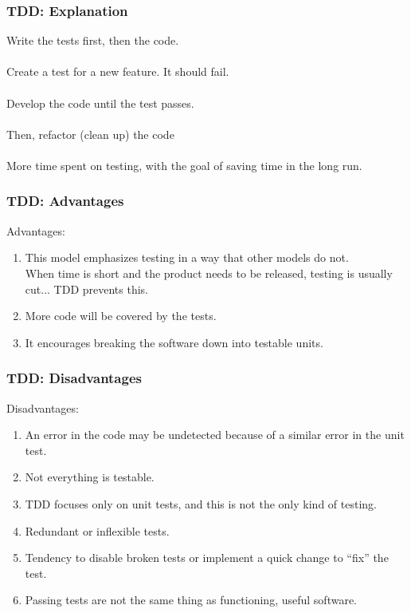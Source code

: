 \begin{frame}
\frametitle{TDD: Explanation}
\begin{changemargin}{1.5cm}

Write the tests first, then the code.\\~\\

Create a test for a new feature. It should fail.\\~\\

Develop the code until the test passes.\\~\\

Then, refactor (clean up) the code\\~\\

More time spent on testing, with the goal of saving time in the long run.

\end{changemargin}
\end{frame}

\begin{frame}
\frametitle{TDD: Advantages}
\begin{changemargin}{1.5cm}

Advantages:
\begin{enumerate}
	\item This model emphasizes testing in a way that other models do not. 
	\\
	When time is short and the product needs to be released, testing is usually cut... TDD prevents this.
	\item More code will be covered by the tests.
	\item It encourages breaking the software down into testable units.
\end{enumerate}

\end{changemargin}
\end{frame}

\begin{frame}
\frametitle{TDD: Disadvantages}
\begin{changemargin}{1.5cm}

Disadvantages:
\begin{enumerate}
	\item An error in the code may be undetected because of a similar error in the unit test.
	\item Not everything is testable.
	\item TDD focuses only on unit tests, and this is not the only kind of testing.
	\item Redundant or inflexible tests.
	\item Tendency to disable broken tests or implement a quick change to ``fix'' the test.
	\item Passing tests are not the same thing as functioning, useful software.
\end{enumerate}

\end{changemargin}
\end{frame}

